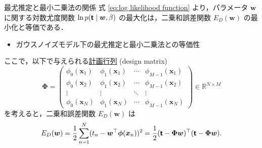 \documentclass[uplatex,11pt,dvipdfmx,aspectratio=169,unicode,t]{beamer}
\numberwithin{equation}{section}
\newcommand{\BR}{\mathbb{R}}
\newcommand{\tb}[1]{\textbf{#1}}
\newcommand{\ts}[1]{\textsf{#1}}
\newcommand{\bs}[1]{\boldsymbol{#1}}
\newcommand{\1}{\bs{1}}
\newcommand{\0}{\bs{0}}
\begin{document}
\begin{frame}{最尤推定と最小二乗法の関係}
    式 \eqref{eq:log likelihood function} より，パラメータ $\bs{w}$ に関する対数尤度関数 $\ln p(\tb{\ts{t}} \mid \bs{w},\beta)$ の最大化は，二乗和誤差関数 $E_{D}(\bs{w})$ の最小化と等価である．
    \begin{itemize}
        \item ガウスノイズモデル下の最尤推定と最小二乗法との等価性
    \end{itemize}
    ここで，以下で与えられる\underline{計画行列} (design matrix)
    \begin{equation}
        \bs{\Phi} = \begin{pmatrix}
            \phi_{0}(\bs{x}_{1}) & \phi_{1}(\bs{x}_{1}) & \cdots & \phi_{M-1}(\bs{x}_{1}) \\
            \phi_{0}(\bs{x}_{2}) & \phi_{1}(\bs{x}_{2}) & \cdots & \phi_{M-1}(\bs{x}_{2}) \\
            \vdots & \vdots & \ddots & \vdots \\
            \phi_{0}(\bs{x}_{N}) & \phi_{1}(\bs{x}_{N}) & \cdots & \phi_{M-1}(\bs{x}_{N})
        \end{pmatrix} \in \BR^{N \times M}
    \end{equation}
    を考えると，二乗和誤差関数 $E_{D}(\bs{w})$ は
    \begin{equation}
        E_{D}(\bs{w}) = \frac{1}{2} \sum_{n=1}^{N} (t_{n} - \bs{w}^{\top}\bs{\phi}(\bs{x}_{n}))^{2} = \frac{1}{2} (\tb{\ts{t}} - \bs{\Phi}\bs{w})^{\top} (\tb{\ts{t}} - \bs{\Phi}\bs{w}).
    \end{equation}
\end{frame}
\end{document}
